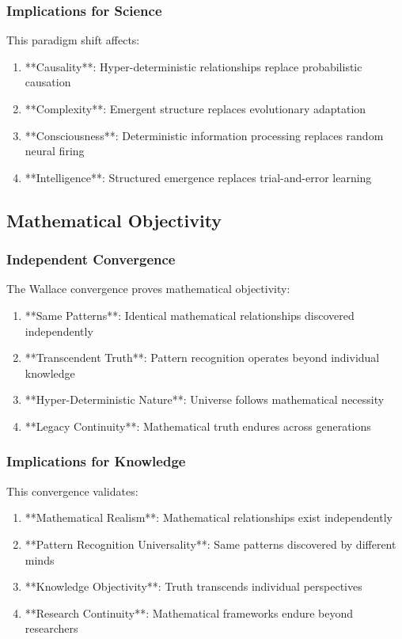 \documentclass[12pt]{article}
\begin{document}
\subsubsection{Implications for Science}

This paradigm shift affects:

\begin{enumerate}
    \item **Causality**: Hyper-deterministic relationships replace probabilistic causation
    \item **Complexity**: Emergent structure replaces evolutionary adaptation
    \item **Consciousness**: Deterministic information processing replaces random neural firing
    \item **Intelligence**: Structured emergence replaces trial-and-error learning
\end{enumerate}

\subsection{Mathematical Objectivity}

\subsubsection{Independent Convergence}

The Wallace convergence proves mathematical objectivity:

\begin{enumerate}
    \item **Same Patterns**: Identical mathematical relationships discovered independently
    \item **Transcendent Truth**: Pattern recognition operates beyond individual knowledge
    \item **Hyper-Deterministic Nature**: Universe follows mathematical necessity
    \item **Legacy Continuity**: Mathematical truth endures across generations
\end{enumerate}

\subsubsection{Implications for Knowledge}

This convergence validates:

\begin{enumerate}
    \item **Mathematical Realism**: Mathematical relationships exist independently
    \item **Pattern Recognition Universality**: Same patterns discovered by different minds
    \item **Knowledge Objectivity**: Truth transcends individual perspectives
    \item **Research Continuity**: Mathematical frameworks endure beyond researchers
\end{enumerate}
\end{document}

